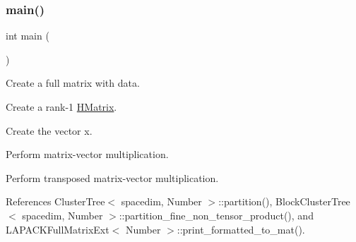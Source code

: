 \subsubsection{\texorpdfstring{main()}{main()}}
{\footnotesize\ttfamily int main (\begin{DoxyParamCaption}{ }\end{DoxyParamCaption})}

Create a full matrix with data.

Create a rank-\/1 \hyperlink{classHMatrix}{H\+Matrix}.

Create the vector x.

Perform matrix-\/vector multiplication.

Perform transposed matrix-\/vector multiplication.

References Cluster\+Tree$<$ spacedim, Number $>$\+::partition(), Block\+Cluster\+Tree$<$ spacedim, Number $>$\+::partition\+\_\+fine\+\_\+non\+\_\+tensor\+\_\+product(), and L\+A\+P\+A\+C\+K\+Full\+Matrix\+Ext$<$ Number $>$\+::print\+\_\+formatted\+\_\+to\+\_\+mat().

